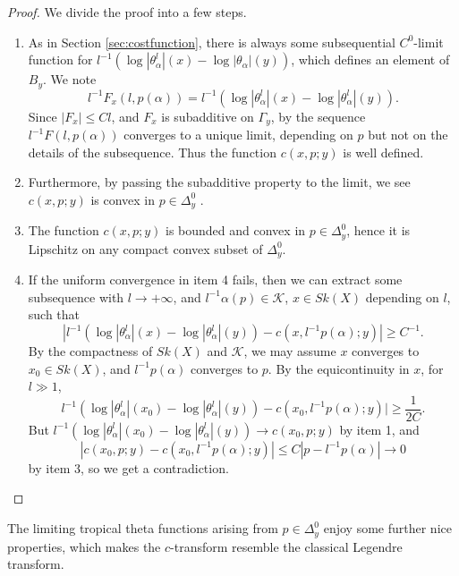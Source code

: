 \documentclass[a4paper]{article}
\theoremstyle{definition}
\begin{document}
	
	
	
	
	
	\begin{proof}
		We divide the proof into a few steps.
		
		\begin{enumerate}
			\item 	As in Section \ref{sec:costfunction}, there is always some subsequential $C^0$-limit function for $  l^{-1}(\log |\theta_\alpha^l|(x)- \log |\theta_\alpha|(y) )$, which defines an element of $B_y$. We note
			\[
			l^{-1}	F_x(l,p(\alpha))=  l^{-1}(\log |\theta_\alpha^l|(x)- \log |\theta_\alpha^l |(y) ).
			\] 
			Since $|F_x|\leq Cl$, and $F_x$ is subadditive on $\Gamma_y$, by  \cite[Thm. 3.1]{WittNystrom}  the sequence $l^{-1}F(l, p(\alpha))$ converges to a unique limit, depending on $p$ but not on the details of the subsequence. Thus the function $c(x,p;y)$ is well defined.
			
			\item 		Furthermore, by passing the subadditive property to the limit, we see $c(x,p;y)$ is convex in $p\in \Delta_y^0$ \cite[Thm. 3.1]{WittNystrom}.
			
			\item 
			The function $c(x,p;y)$ is bounded and convex in $p\in \Delta_y^0$, hence it is Lipschitz on any compact convex subset of $\Delta_y^0$. 
			
			\item If the uniform convergence in item 4 fails, then we can extract some subsequence with $l\to +\infty$, and $l^{-1} \alpha(p)\in \mathcal{K}$, $x\in Sk(X)$ depending on $l$, such that  
			\[
			|  l^{-1}(\log |\theta_\alpha^l|(x)- \log |\theta_\alpha^l |(y) )- c(x, l^{-1} p(\alpha);y) | \geq C^{-1}.
			\]
			By the compactness of $Sk(X)$ and $\mathcal{K}$, we may assume $x$ converges to $x_0\in Sk(X)$, and $l^{-1}p(\alpha)$ converges to $p$. By the equicontinuity in $x$, for $l\gg 1$,
			\[
			l^{-1}(\log |\theta_\alpha^l|(x_0)- \log |\theta_\alpha^l |(y) )- c(x_0,  l^{-1}p(\alpha);y) | \geq \frac{1}{2C}.
			\]
			But $ l^{-1}(\log |\theta_\alpha^l|(x_0)- \log |\theta_\alpha^l |(y) )\to c(x_0,p;y)$ by item 1, and
			\[
			|c(x_0, p ; y)- c(x_0, l^{-1} p(\alpha); y)|\leq C|p-l^{-1}p(\alpha)|\to 0\] 
			by item 3, so we get a contradiction. 
		\end{enumerate}
	\end{proof}
	
	



The limiting tropical theta functions arising from $p\in \Delta_y^0$ enjoy some further nice properties, which makes the $c$-transform resemble the classical Legendre transform.
\end{document}
